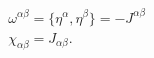 \begin{equation}
 \begin{array}{l}
 \omega^{\alpha\beta}=\{\eta^\alpha , \eta^\beta\}=-J^{\alpha\beta} \\ \chi_{\alpha\beta}=J_{\alpha\beta}.
 \end{array}
 \label{a46}
 \end{equation}

